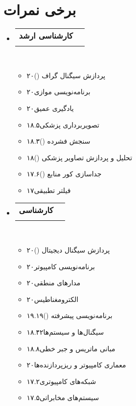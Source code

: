 \documentclass[a4paper,11pt]{article}
\makeatletter
\newcommand{\resumeItemScore}[2]{\item[]\small#1\hfill#2}
\newcommand{\resumeItemListStart}{\begin{itemize}[rightmargin=0.11in]}
\newcommand{\resumeItemListEnd}{\end{itemize}}
\newcommand{\resumeQuadHeading}[4]{
\item
\begin{tabular*}{0.96\textwidth}[t]{l@{\extracolsep{\fill}}r}
\textbf{#1} & #2 \\
\textit{\small#3} & \textit{\small #4} \\
\end{tabular*}
}
\newcommand{\resumeHeadingListStart}{
\begin{itemize}[leftmargin=0.15in, label={}]
}
\newcommand{\resumeHeadingListEnd}{\end{itemize}}
\makeatother
\begin{document}
\section{برخی نمرات} %
%
\resumeHeadingListStart{}
\resumeQuadHeading{کارشناسی ارشد}{}{}{}\\\vspace{-1.5em} %

\begin{multicols}{2}
\resumeItemListStart{}
\resumeItemScore{پردازش سیگنال گراف ()}{۲۰}
\resumeItemScore{برنامه‌نویسی موازی}{۲۰}
\resumeItemScore{یادگیری عمیق}{۲۰}
\resumeItemScore{تصویربرداری پزشکی}{۱۸.۵}
\resumeItemScore{سنجش فشرده ()}{۱۸.۳}
\resumeItemScore{تحلیل و پردازش تصاویر پزشکی ()}{۱۸}
\resumeItemScore{جداسازی کور منابع ()}{۱۷.۶}
\resumeItemScore{فیلتر تطبیقی}{۱۷}
\resumeItemListEnd{}
\end{multicols}


\resumeQuadHeading{کارشناسی}{}{}{}\\\vspace{-1.5em} %
\begin{multicols}{2}
\resumeItemListStart{}
\resumeItemScore{پردازش سیگنال دیجیتال ()}{۲۰}
\resumeItemScore{برنامه‌نویسی کامپیوتر}{۲۰}
\resumeItemScore{مدارهای منطقی}{۲۰}
\resumeItemScore{الکترومغناطیس}{۲۰}
\resumeItemScore{برنامه‌نویسی پیشرفته ()}{۱۹.۱۹}
\resumeItemScore{سیگنال‌ها و سیستم‌ها}{۱۸.۴۲}
\resumeItemScore{مبانی ماتریس و جبر خطی}{۱۸.۸}
\resumeItemScore{معماری کامپیوتر و ریزپردازنده‌ها}{۲۰}
\resumeItemScore{شبکه‌های کامپیوتری}{۱۷.۲}
\resumeItemScore{سیستم‌های مخابراتی}{۱۷.۵}
\resumeItemListEnd{}
\end{multicols}

\resumeHeadingListEnd{}

\end{document}
